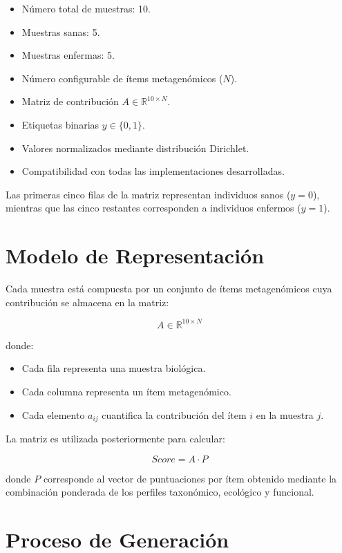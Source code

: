 \begin{itemize}
\item Número total de muestras: 10.
\item Muestras sanas: 5.
\item Muestras enfermas: 5.
\item Número configurable de ítems metagenómicos ($N$).
\item Matriz de contribución $A \in \mathbb{R}^{10\times N}$.
\item Etiquetas binarias $y \in \{0,1\}$.
\item Valores normalizados mediante distribución Dirichlet.
\item Compatibilidad con todas las implementaciones desarrolladas.
\end{itemize}

Las primeras cinco filas de la matriz representan individuos sanos ($y=0$), mientras que las cinco restantes corresponden a individuos enfermos ($y=1$).

\section{Modelo de Representación}

Cada muestra está compuesta por un conjunto de ítems metagenómicos cuya contribución se almacena en la matriz:

\[
A \in \mathbb{R}^{10 \times N}
\]

donde:

\begin{itemize}
\item Cada fila representa una muestra biológica.
\item Cada columna representa un ítem metagenómico.
\item Cada elemento $a_{ij}$ cuantifica la contribución del ítem $i$ en la muestra $j$.
\end{itemize}

La matriz es utilizada posteriormente para calcular:

\[
Score = A \cdot P
\]

donde $P$ corresponde al vector de puntuaciones por ítem obtenido mediante la combinación ponderada de los perfiles taxonómico, ecológico y funcional.

\section{Proceso de Generación}

